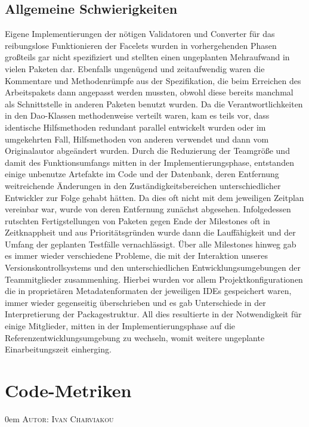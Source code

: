 \documentclass{article}
\makeatletter
\newcommand{\sectionauthor}[1]{
	{\parindent 0em \large \scshape Autor: #1 \par \nobreak \vspace*{1em}}
	\@afterheading
}
\makeatother
\begin{document}
\subsection{Allgemeine Schwierigkeiten}
Eigene Implementierungen der nötigen Validatoren und Converter für das reibungslose Funktionieren der Facelets wurden in vorhergehenden Phasen großteils gar nicht spezifiziert und stellten einen ungeplanten Mehraufwand in vielen Paketen dar. Ebenfalls ungenügend und zeitaufwendig waren die Kommentare und Methodenrümpfe aus der Spezifikation, die beim Erreichen des Arbeitspakets dann angepasst werden mussten, obwohl diese bereits manchmal als Schnittstelle in anderen Paketen benutzt wurden. Da die Verantwortlichkeiten in den Dao-Klassen methodenweise verteilt waren, kam es teils vor, dass identische Hilfsmethoden redundant parallel entwickelt wurden oder im umgekehrten Fall, Hilfsmethoden von anderen verwendet und dann vom Originalautor abgeändert wurden. Durch die Reduzierung der Teamgröße und damit des Funktionsumfangs mitten in der Implementierungsphase, entstanden einige unbenutze Artefakte im Code und der Datenbank, deren Entfernung weitreichende Änderungen in den Zuständigkeitsbereichen unterschiedlicher Entwickler zur Folge gehabt hätten. Da dies oft nicht mit dem jeweiligen Zeitplan vereinbar war, wurde von deren Entfernung zunächst abgesehen. Infolgedessen rutschten Fertigstellungen von Paketen gegen Ende der Milestones oft in Zeitknappheit und aus Prioritätsgründen wurde dann die Lauffähigkeit und der Umfang der geplanten Testfälle vernachlässigt. Über alle Milestones hinweg gab es immer wieder verschiedene Probleme, die mit der Interaktion unseres Versionskontrollsystems und den unterschiedlichen Entwicklungsumgebungen der Teammitglieder zusammenhing. Hierbei wurden vor allem Projektkonfigurationen die in proprietären Metadatenformaten der jeweiligen IDEs gespeichert waren, immer wieder gegenseitig überschrieben und es gab Unterschiede in der Interpretierung der Packagestruktur. All dies resultierte in der Notwendigkeit für einige Mitglieder, mitten in der Implementierungsphase auf die Referenzentwicklungsumgebung zu wechseln, womit weitere ungeplante Einarbeitungszeit einherging.

\section{Code-Metriken}
\sectionauthor{Ivan Charviakou}
\end{document}
